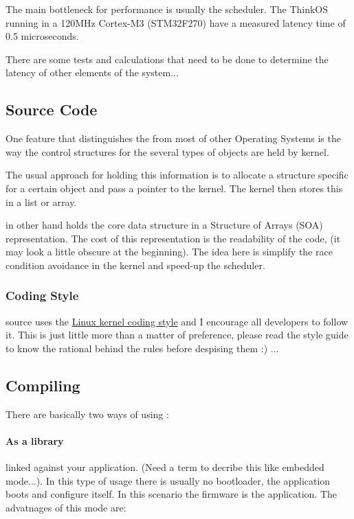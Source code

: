 The main bottleneck for performance is usually the scheduler. The ThinkOS running in a 120MHz Cortex-M3 (STM32F270) have a measured latency time of 0.5 microseconds.

There are some tests and calculations that need to be done to determine the latency of other elements of the system...


\subsection {Source Code}

One feature that distinguishes the \ThinkOS from most of other Operating Systems is the way the control structures for the several types of objects are held by kernel.

The usual approach for holding this information is to allocate a structure specific for a certain object and pass a pointer to the kernel. The kernel then stores this in a list or array. 

\ThinkOS in other hand holds the core data structure in a  Structure of Arrays (SOA) representation. The cost of this representation is the readability of the code, (it may look a little obscure at the beginning). 
The idea here is simplify the race condition avoidance in the kernel and speed-up the scheduler.

\subsubsection{Coding Style}

\ThinkOS source uses the \href{https://www.kernel.org/doc/html/v4.10/process/coding-style.html}{Linux kernel coding style} and I encourage all developers to follow it. This is just little more than a matter of preference, please read the style guide to know the rational behind the rules before despising them :) ...


\subsection{Compiling}

There are basically two ways of using \ThinkOS:

\paragraph{As a library}{ linked against your application. (Need a term to decribe this like embedded mode...). 
In this type of usage there is usually no bootloader, the application boots and configure itself. In this scenario the firmware is the application. The advatnages of this mode are:}


